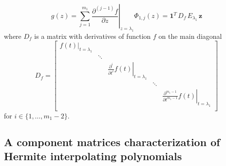 \begin{displaymath}
g(z) = \sum_{j=1}^{m_{1}}{ \left.  \frac{\partial^{(j-1)}{f}}{\partial{z}} \right|_{z=\lambda_{1}}\Phi_{1,j}(z) } = \boldsymbol{1}^{T}\,D_{f}\, E_{\lambda_{1}} \,\boldsymbol{z}
\end{displaymath}
where $D_{f}$ is a matrix with derivatives of function $f$ on the main diagonal
\begin{displaymath}
D_{f} = 
\left[
    \begin{array}{ccccc}
        \left.f(t)\right|_{t=\lambda_{1}} & \\
                                          &  \ddots \\
                                          &         & \left.\frac{\partial^{i}}{\partial t^{i}}f(t)\right|_{t=\lambda_{1}} \\
                                          &         &                                                                       & \ddots \\
                                          &         &                                                                       &        &  \left.\frac{\partial^{m_{1}-1}}{\partial t^{m_{1}-1}}f(t)\right|_{t=\lambda_{1}} \\
    \end{array}
\right]
\end{displaymath}
for $i\in  \lbrace 1,\ldots,m_{1}-2 \rbrace$.

\subsection{A component matrices characterization of Hermite interpolating polynomials}


